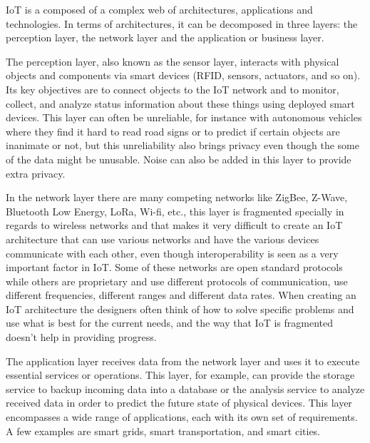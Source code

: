 \documentclass[conference]{IEEEtran}
\begin{document}
IoT is a composed of a complex web of architectures, applications and technologies.
In terms of architectures, it can be decomposed in three layers: the perception
layer, the network layer and the application or business layer.

The perception layer, also known as the sensor layer, interacts with physical
objects and components via smart devices (RFID, sensors, actuators, and so
on). Its key objectives are to connect objects to the IoT network and to monitor,
collect, and analyze status information about these things using deployed
smart devices. This layer can often be unreliable, for instance with autonomous
vehicles where they find it hard to read road signs or to predict if certain
objects are inanimate or not, but this unreliability also brings privacy
even though the some of the data might be unusable. Noise can also be added
in this layer to provide extra privacy.

In the network layer there are many competing networks like ZigBee, Z-Wave,
Bluetooth Low Energy, LoRa, Wi-fi, etc., this layer is fragmented specially
in regards to wireless networks and that makes it very difficult to create
an IoT architecture that can use various networks and have the various
devices communicate with each other, even though interoperability is seen
as a very important factor in IoT. Some of these networks are open standard
protocols while others are proprietary and use different protocols of communication,
use different frequencies, different ranges and different data rates. When
creating an IoT architecture the designers often think of how to solve
specific problems and use what is best for the current needs, and the way
that IoT is fragmented doesn't help in providing progress.

The application layer receives data from the network layer and uses it to
execute essential services or operations. This layer, for example, can provide
the storage service to backup incoming data into a database or the analysis
service to analyze received data in order to predict the future state of
physical devices. This layer encompasses a wide range of applications, each
with its own set of requirements. A few examples are smart grids, smart transportation,
and smart cities.
\end{document}
